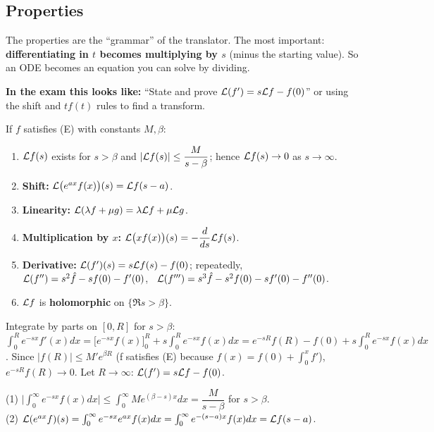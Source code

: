 \subsection{Properties \texorpdfstring{}{}}\label{ss:3-2}
\begin{plainbox}
The properties are the ``grammar'' of the translator. The most important: \textbf{differentiating in $t$ becomes multiplying by $s$}
(minus the starting value). So an ODE becomes an equation you can solve by dividing.
\par\smallskip\textbf{In the exam this looks like:} ``State and prove $\mathcal{L}(f')=s\mathcal{L} f-f(0)$'' or using the shift and $t f(t)$ rules to find a transform.
\end{plainbox}
\begin{thmbox}[title={Proposition 0.25 and 0.26}]
If $f$ satisfies (E) with constants $M,\beta$:
\begin{enumerate}
\item $\mathcal{L} f(s)$ exists for $s>\beta$ and $|\mathcal{L} f(s)|\le\dfrac{M}{s-\beta}$; hence $\mathcal{L} f(s)\to0$ as $s\to\infty$.
\item \textbf{Shift:} $\mathcal{L}\big(e^{ax}f(x)\big)(s)=\mathcal{L} f(s-a)$.
\item \textbf{Linearity:} $\mathcal{L}(\lambda f+\mu g)=\lambda\mathcal{L} f+\mu\mathcal{L} g$.
\item \textbf{Multiplication by $x$:} $\mathcal{L}\big(xf(x)\big)(s)=-\dfrac{d}{ds}\mathcal{L} f(s)$.
\item \textbf{Derivative:} $\mathcal{L}(f')(s)=s\mathcal{L} f(s)-f(0)$; repeatedly,
$\mathcal{L}(f'')=s^2\hat f-sf(0)-f'(0)$, \ $\mathcal{L}(f''')=s^3\hat f-s^2f(0)-sf'(0)-f''(0)$.
\item $\mathcal{L} f$ is \textbf{holomorphic} on $\{\Re s>\beta\}$.
\end{enumerate}
\end{thmbox}

\begin{proofbox}[title={Proof of the derivative rule (5) \fr{93}}]
Integrate by parts on $[0,R]$ for $s>\beta$:
$\int_0^Re^{-sx}f'(x)dx=\big[e^{-sx}f(x)\big]_0^R+s\int_0^Re^{-sx}f(x)dx=e^{-sR}f(R)-f(0)+s\int_0^Re^{-sx}f(x)dx$.
Since $|f(R)|\le M'e^{\beta R}$ (f satisfies (E) because $f(x)=f(0)+\int_0^xf'$), $e^{-sR}f(R)\to0$. Let $R\to\infty$: $\mathcal{L}(f')=s\mathcal{L} f-f(0)$.
\end{proofbox}
\begin{proofbox}[title={Proof of the bound (1) and the shift rule (2)}]
(1) $\big|\int_0^\infty e^{-sx}f(x)dx\big|\le\int_0^\infty Me^{(\beta-s)x}dx=\dfrac{M}{s-\beta}$ for $s>\beta$.\\
(2) $\mathcal{L}(e^{ax}f)(s)=\int_0^\infty e^{-sx}e^{ax}f(x)dx=\int_0^\infty e^{-(s-a)x}f(x)dx=\mathcal{L} f(s-a)$.
\end{proofbox}

